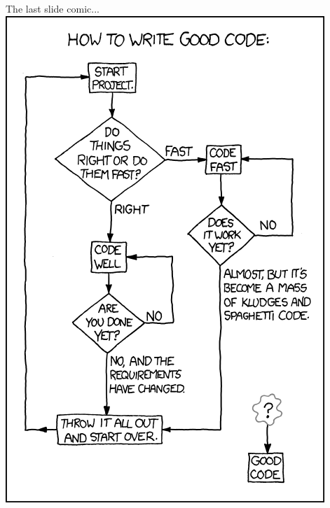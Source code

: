 \documentclass[11pt]{beamer}
\begin{document}
\begin{frame}{The last slide comic...}
\center
\includegraphics[scale=0.3]{good_code.png}
\end{frame}
\end{document}
